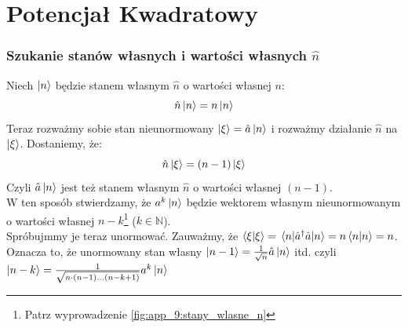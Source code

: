 \documentclass[12pt,a4paper]{report}
\newenvironment{lecture}[1]{\par\medskip
   \noindent\chapter{#1} \rmfamily}{\medskip}
\begin{document}
\begin{lecture}{Potencjał Kwadratowy}
    \subsection{Szukanie stanów własnych i wartości własnych $\hat{n}$}
    Niech $\ket{n}$ będzie stanem własnym $\hat{n}$ o wartości własnej $n$:
    \[
        \hat{n} \ket{n} = n \ket{n}
    \]
    Teraz rozważmy sobie stan nieunormowany $\ket{\xi} = \hat{a} \ket{n}$ i rozważmy działanie $\hat{n}$ na $\ket{\xi}$. Dostaniemy, że:
    \[
        \hat{n} \ket{\xi} = (n-1)\ket{\xi}
    \]
    Czyli $\hat{a}\ket{n}$ jest też stanem własnym $\hat{n}$ o wartości własnej $(n-1)$.\\
    W ten sposób stwierdzamy, że $a^k \ket{n}$ będzie wektorem własnym nieunormowanym o wartości własnej $n-k$\footnote{Patrz wyprowadzenie \ref{fig:app_9:stany_wlasne_n}} ($k\in\mathbb{N}$).\\
    Spróbujmmy je teraz unormować. Zauważmy, że $\braket{\xi} = \ev{\hat{a}^\dagger\hat{a}}{n} = n \braket{n} = n$.\\
    Oznacza to, że unormowany stan własny $\ket{n - 1} = \frac{1}{\sqrt{n}} \hat{a} \ket{n}$ itd. czyli $\ket{n-k} = \frac{1}{\sqrt{n \cdot(n-1) \dots  (n-k+1)}} a^k \ket{n}$
    

\end{lecture}
\end{document}
